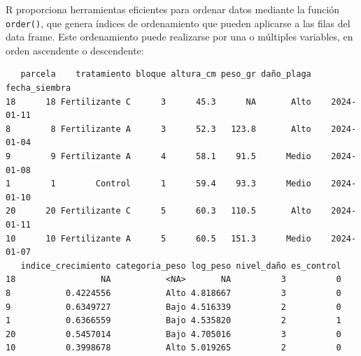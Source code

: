 \documentclass[
  spanish,
  a4paper,
  DIV=11,
  numbers=noendperiod,
  onepage,
  openany]{scrreprt}
\newenvironment{Shaded}{\begin{snugshade}}{\end{snugshade}}
\newcommand{\CommentTok}[1]{\textcolor[rgb]{0.37,0.37,0.37}{#1}}
\newcommand{\FunctionTok}[1]{\textcolor[rgb]{0.28,0.35,0.67}{#1}}
\newcommand{\NormalTok}[1]{\textcolor[rgb]{0.00,0.23,0.31}{#1}}
\newcommand{\OtherTok}[1]{\textcolor[rgb]{0.00,0.23,0.31}{#1}}
\newcommand{\SpecialCharTok}[1]{\textcolor[rgb]{0.37,0.37,0.37}{#1}}
\begin{document}
R proporciona herramientas eficientes para ordenar datos mediante la
función \texttt{order()}, que genera índices de ordenamiento que pueden
aplicarse a las filas del data frame. Este ordenamiento puede realizarse
por una o múltiples variables, en orden ascendente o descendente:

\begin{Shaded}
\end{Shaded}

\begin{verbatim}
   parcela    tratamiento bloque altura_cm peso_gr daño_plaga fecha_siembra
18      18 Fertilizante C      3      45.3      NA       Alto    2024-01-11
8        8 Fertilizante A      3      52.3   123.8       Alto    2024-01-04
9        9 Fertilizante A      4      58.1    91.5      Medio    2024-01-08
1        1        Control      1      59.4    93.3      Medio    2024-01-10
20      20 Fertilizante C      5      60.3   110.5       Alto    2024-01-11
10      10 Fertilizante A      5      60.5   151.3      Medio    2024-01-07
   indice_crecimiento categoria_peso log_peso nivel_daño es_control
18                 NA           <NA>       NA          3          0
8           0.4224556           Alto 4.818667          3          0
9           0.6349727           Bajo 4.516339          2          0
1           0.6366559           Bajo 4.535820          2          1
20          0.5457014           Bajo 4.705016          3          0
10          0.3998678           Alto 5.019265          2          0
\end{verbatim}

\begin{Shaded}
\end{Shaded}
\end{document}
